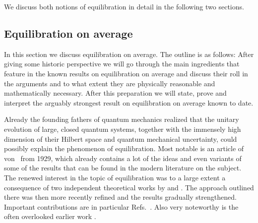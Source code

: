 \documentclass[a4paper,12pt,listof=totoc,index=totoc,bibliography=totoc,headsepline=false,headings=normal,BCOR16.153846mm,DIV12,headinclude,twoside,cleardoublepage=empty,numbers=noenddot,final]{scrreprt}
\theoremstyle{mystyle}
\numberwithin{equation}{section}
\numberwithin{figure}{section}
\numberwithin{lemma}{section}
\numberwithin{theorem}{section}
\numberwithin{corollary}{section}
\numberwithin{definition}{section}
\numberwithin{conjecture}{section}
\numberwithin{observation}{section}
\newcommand{\+}{\mkern2mu}
\DeclareMathOperator{\1}{\mathds{1}}
\begin{document}
We discuss both notions of equilibration in detail in the following two sections.


\subsection{Equilibration on average}
\label{sec:equlibrationintheweaksense}
%
In this section we discuss equilibration on average.
The outline is as follows:
After giving some historic perspective we will go through the main ingredients that feature in the known results on equilibration on average and discuss their roll in the arguments and to what extent they are physically reasonable and mathematically necessary.
After this preparation we will state, prove and interpret the arguably strongest result on equilibration on average known to date.

Already the founding fathers of quantum mechanics realized that the unitary evolution of large, closed quantum systems, together with the immensely high dimension of their Hilbert space and quantum mechanical uncertainty, could possibly explain the phenomenon of equilibration.
Most notable is an article of von~\textcite{vonneumann1929} from 1929, which already contains a lot of the ideas and even variants of some of the results that can be found in the modern literature on the subject.
The renewed interest in the topic of equilibration was to a large extent a consequence of two independent theoretical works by \textcite{Reimann08} and \textcite{Linden09}.
The approach outlined there was then more recently refined and the results gradually strengthened. 
Important contributions are in particular Refs.~\cite{Reimann12,1110.5759v1,1012.4622v1}.
Also very noteworthy is the often overlooked earlier work \cite{tasaki98}.
\end{document}
